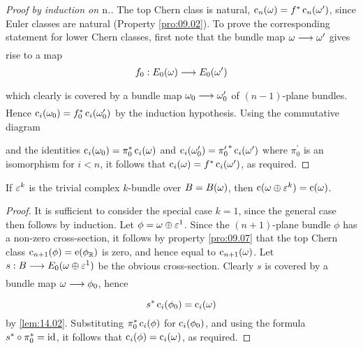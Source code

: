 \documentclass[../main]{subfiles}
\begin{document}
\begin{proof}[Proof by induction on $\mathrm{n}$.]
The top Chern class is natural, $\operatorname{c}_n(\omega) = f^\ast \operatorname{c}_n(\omega^\prime)$, since Euler classes are natural (Property \ref{pro:09.02}). To prove the corresponding statement for lower Chern classes, first note that the bundle map $\omega\varrightarrow{}\omega^\prime$ gives rise to a map \[f_0:\total_0(\omega)\varrightarrow{}\total_0(\omega^\prime)\] which clearly is covered by a bundle map $\omega_0\varrightarrow{}\omega_0^\prime$ of $(n-1)$-plane bundles. Hence $\operatorname{c}_i(\omega_0) = f^\ast_0\operatorname{c}_i(\omega_0^\prime)$ by the induction hypothesis. Using the commutative diagram

\begin{figure}[h]
\centering
{}
\end{figure}

\noindent and the identities $\operatorname{c}_i(\omega_0)=\pi^\ast_0 \operatorname{c}_i(\omega)$ and $\operatorname{c}_i(\omega_0^\prime)={\pi_0^\prime}^\ast \operatorname{c}_i(\omega^\prime)$ where $\pi_0^\prime$ is an isomorphism for $i<n$, it follows that $\operatorname{c}_i(\omega) = f^\ast \operatorname{c}_i(\omega^\prime)$, as required.
\end{proof}
\begin{lemma}
\label{lem:14.03}
If $\varepsilon^k$ is the trivial complex $k$-bundle over $B = B(\omega)$, then \newline $\operatorname{c}(\omega \oplus \varepsilon^k) = \operatorname{c}(\omega)$.
\end{lemma}
\begin{proof}
It is sufficient to consider the special case $k=1$, since the general case then follows by induction. Let $\phi = \omega\oplus\varepsilon^1$. Since the $(n+1)$-plane bundle $\phi$ has a non-zero cross-section, it follows by property \ref{pro:09.07} that the top Chern class $\operatorname{c}_{n+1}(\phi) = \operatorname{e}(\phi_\mathbb R)$ is zero, and hence equal to $\operatorname{c}_{n+1}(\omega)$. Let $s:\B\varrightarrow{} \total_0(\omega\oplus\trivialbundle^1)$ be the obvious cross-section. Clearly $s$ is covered by a bundle map $\omega\varrightarrow{} \phi_0$, hence \[s^\ast \operatorname{c}_i(\phi_0)=\operatorname{c}_i(\omega)\] by \ref{lem:14.02}. Substituting $\pi^\ast_0 \operatorname{c}_i(\phi)$ for $\operatorname{c}_i(\phi_0)$, and using the formula $s^\ast \circ \pi_0^\ast = \operatorname{id}$, it follows that $\operatorname{c}_i(\phi) = \operatorname{c}_i(\omega)$, as required. 
\end{proof}
\end{document}
